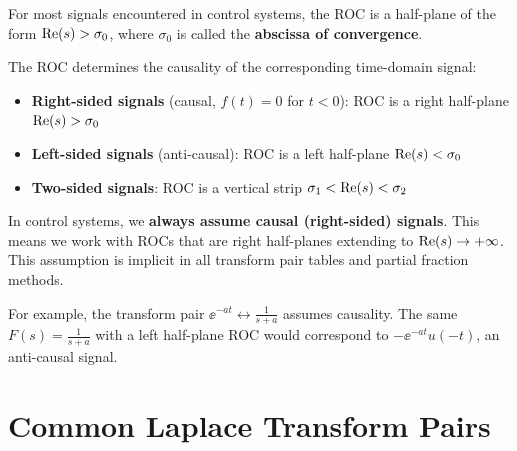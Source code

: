 For most signals encountered in control systems, the ROC is a half-plane of the form $\operatorname{Re}(s) > \sigma_0$, where $\sigma_0$ is called the \textbf{abscissa of convergence}.

\begin{keyconceptbox}[title=ROC and Causality]
The ROC determines the causality of the corresponding time-domain signal:
\begin{itemize}
    \item \textbf{Right-sided signals} (causal, $f(t) = 0$ for $t < 0$): ROC is a right half-plane $\operatorname{Re}(s) > \sigma_0$
    \item \textbf{Left-sided signals} (anti-causal): ROC is a left half-plane $\operatorname{Re}(s) < \sigma_0$
    \item \textbf{Two-sided signals}: ROC is a vertical strip $\sigma_1 < \operatorname{Re}(s) < \sigma_2$
\end{itemize}
\end{keyconceptbox}

\begin{warningbox}
In control systems, we \textbf{always assume causal (right-sided) signals}. This means we work with ROCs that are right half-planes extending to $\operatorname{Re}(s) \to +\infty$. This assumption is implicit in all transform pair tables and partial fraction methods.
\end{warningbox}

For example, the transform pair $\ee^{-at} \leftrightarrow \frac{1}{s+a}$ assumes causality. The same $F(s) = \frac{1}{s+a}$ with a left half-plane ROC would correspond to $-\ee^{-at}u(-t)$, an anti-causal signal.

\section{Common Laplace Transform Pairs}

